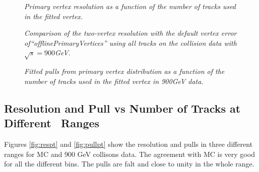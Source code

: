 \begin{figure}[htb]
\begin{center}
\centerline{
}
\caption{\sl
Primary vertex resolution as a function of the number of tracks 
used in the fitted vertex.
}
\label{fig:resvsntrk-900}
\end{center}
\begin{center}
\centerline{
}
\caption{\sl
Comparison of the two-vertex resolution with the default vertex 
error of``offlinePrimaryVertices'' using all tracks on the 
collision data with $\sqrt{s}=900$GeV.
}
\label{fig:errvsntrk-900}
\end{center}
\end{figure}
\begin{figure}[htb]
\begin{center}
\centerline{
}
\caption{\sl
Fitted pulls from primary vertex distribution as a function of the 
number of tracks used in the 
fitted vertex in 900GeV data. }
\label{fig:pullvsntrk-900}
\end{center}
\end{figure}



\subsection{Resolution and Pull vs Number of Tracks at Different \pt\, Ranges}
\label{sub:900respullpt}

Figures \ref{fig:respt} and \ref{fig:pullpt} show the resolution and pulls in three different \ptm ranges for MC and 900 GeV collisons data. The agreement with MC is very good for all the different \ptm bins. The pulls are falt and close to unity in the whole range.

